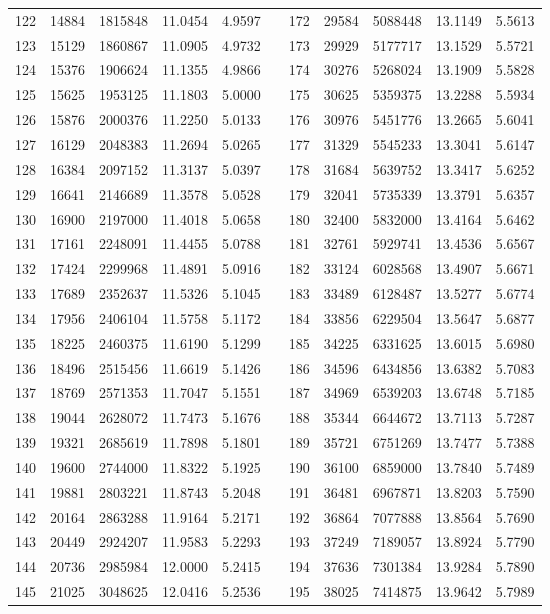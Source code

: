 \begin{longtable}{rrrrrrrrrrr}
122&14884&1815848&11.0454&4.9597&&172&29584&5088448&13.1149&5.5613\\
123&15129&1860867&11.0905&4.9732&&173&29929&5177717&13.1529&5.5721\\
124&15376&1906624&11.1355&4.9866&&174&30276&5268024&13.1909&5.5828\\
125&15625&1953125&11.1803&5.0000&&175&30625&5359375&13.2288&5.5934\\
126&15876&2000376&11.2250&5.0133&&176&30976&5451776&13.2665&5.6041\\
127&16129&2048383&11.2694&5.0265&&177&31329&5545233&13.3041&5.6147\\
128&16384&2097152&11.3137&5.0397&&178&31684&5639752&13.3417&5.6252\\
129&16641&2146689&11.3578&5.0528&&179&32041&5735339&13.3791&5.6357\\
130&16900&2197000&11.4018&5.0658&&180&32400&5832000&13.4164&5.6462\\
131&17161&2248091&11.4455&5.0788&&181&32761&5929741&13.4536&5.6567\\
132&17424&2299968&11.4891&5.0916&&182&33124&6028568&13.4907&5.6671\\
133&17689&2352637&11.5326&5.1045&&183&33489&6128487&13.5277&5.6774\\
134&17956&2406104&11.5758&5.1172&&184&33856&6229504&13.5647&5.6877\\
135&18225&2460375&11.6190&5.1299&&185&34225&6331625&13.6015&5.6980\\
136&18496&2515456&11.6619&5.1426&&186&34596&6434856&13.6382&5.7083\\
137&18769&2571353&11.7047&5.1551&&187&34969&6539203&13.6748&5.7185\\
138&19044&2628072&11.7473&5.1676&&188&35344&6644672&13.7113&5.7287\\
139&19321&2685619&11.7898&5.1801&&189&35721&6751269&13.7477&5.7388\\
140&19600&2744000&11.8322&5.1925&&190&36100&6859000&13.7840&5.7489\\
141&19881&2803221&11.8743&5.2048&&191&36481&6967871&13.8203&5.7590\\
142&20164&2863288&11.9164&5.2171&&192&36864&7077888&13.8564&5.7690\\
143&20449&2924207&11.9583&5.2293&&193&37249&7189057&13.8924&5.7790\\
144&20736&2985984&12.0000&5.2415&&194&37636&7301384&13.9284&5.7890\\
145&21025&3048625&12.0416&5.2536&&195&38025&7414875&13.9642&5.7989\\

\end{longtable}
